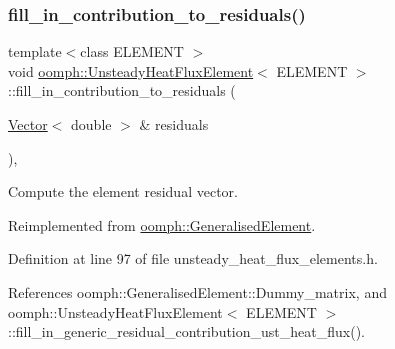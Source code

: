 \subsubsection{\texorpdfstring{fill\+\_\+in\+\_\+contribution\+\_\+to\+\_\+residuals()}{fill\_in\_contribution\_to\_residuals()}}
{\footnotesize\ttfamily template$<$class E\+L\+E\+M\+E\+NT $>$ \\
void \hyperlink{classoomph_1_1UnsteadyHeatFluxElement}{oomph\+::\+Unsteady\+Heat\+Flux\+Element}$<$ E\+L\+E\+M\+E\+NT $>$\+::fill\+\_\+in\+\_\+contribution\+\_\+to\+\_\+residuals (\begin{DoxyParamCaption}\item[{\hyperlink{classoomph_1_1Vector}{Vector}$<$ double $>$ \&}]{residuals }\end{DoxyParamCaption})\hspace{0.3cm}{\ttfamily [inline]}, {\ttfamily [virtual]}}



Compute the element residual vector. 



Reimplemented from \hyperlink{classoomph_1_1GeneralisedElement_a310c97f515e8504a48179c0e72c550d7}{oomph\+::\+Generalised\+Element}.



Definition at line 97 of file unsteady\+\_\+heat\+\_\+flux\+\_\+elements.\+h.



References oomph\+::\+Generalised\+Element\+::\+Dummy\+\_\+matrix, and oomph\+::\+Unsteady\+Heat\+Flux\+Element$<$ E\+L\+E\+M\+E\+N\+T $>$\+::fill\+\_\+in\+\_\+generic\+\_\+residual\+\_\+contribution\+\_\+ust\+\_\+heat\+\_\+flux().

\mbox{\label{classoomph_1_1UnsteadyHeatFluxElement_ad8558d61594ce5f92ecc4a898f2221b6}} 
